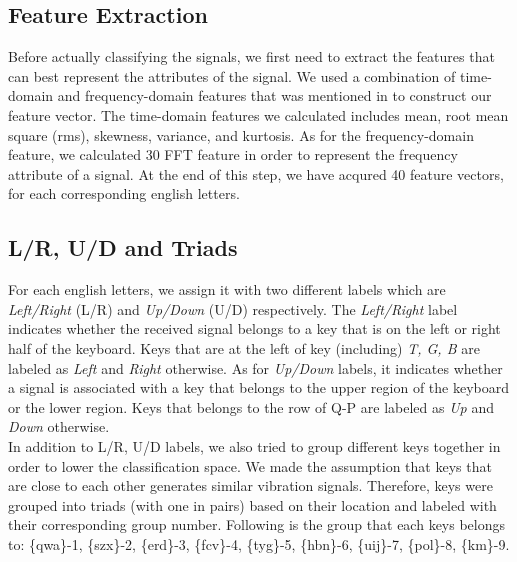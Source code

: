 \documentclass[11pt,conference]{IEEEtran}
\begin{document}
\subsection{Feature Extraction}
\label{sec:feature-extractor}
Before actually classifying the signals, we first need to extract the features that can best represent the attributes of the signal.  We used a combination of time-domain and frequency-domain features that was mentioned in \cite{spiphone} to construct our feature vector. The time-domain features we calculated includes mean, root mean square (rms), skewness, variance, and kurtosis. As for the frequency-domain feature, we calculated 30 FFT feature in order to represent the frequency attribute of a signal. At the end of this step, we have acqured 40 feature vectors, for each corresponding english letters.

\subsection{L/R, U/D and Triads}
\label{sec:labeler}
For each english letters, we assign it with two different labels which are \emph{Left/Right} (L/R) and \emph{Up/Down} (U/D) respectively. The \emph{Left/Right} label indicates whether the received signal belongs to a key that is on the left or right half of the keyboard. Keys that are at the left of key (including) \emph{T, G, B} are labeled as \emph{Left} and \emph{Right} otherwise. As for \emph{Up/Down} labels, it indicates whether a signal is associated with a key that belongs to the upper region of the keyboard or the lower region. Keys that belongs to the row of Q-P are labeled as \emph{Up} and \emph{Down} otherwise.\\

In addition to L/R, U/D labels, we also tried to group different keys together in order to lower the classification space. We made the assumption that keys that are close to each other generates similar vibration signals. Therefore, keys were grouped into triads (with one in pairs) based on their location and labeled with their corresponding group number. Following is the group that each keys belongs to:
\{qwa\}-1, \{szx\}-2, \{erd\}-3, \{fcv\}-4, \{tyg\}-5, \{hbn\}-6, \{uij\}-7, \{pol\}-8, \{km\}-9.
\end{document}
